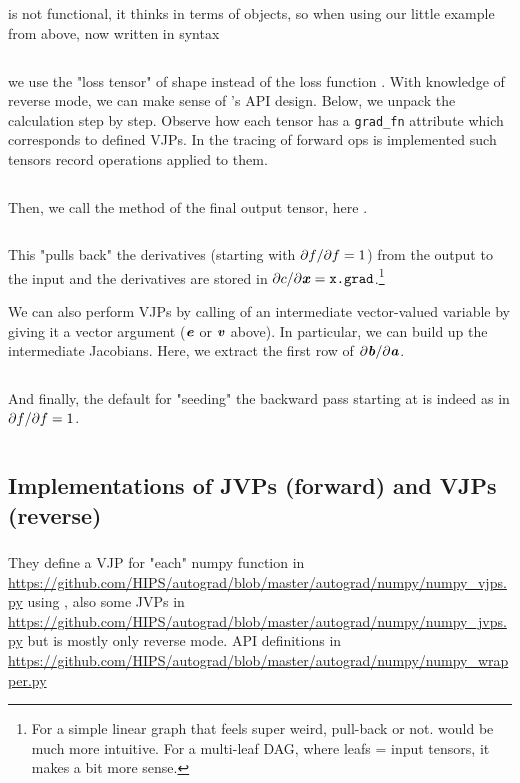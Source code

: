 \documentclass[paper=a4,11pt,headsepline]{scrartcl}
\newcommand{\ipmpy}[1]{\inputminted[xleftmargin=0.9cm]{python}{#1}}
\begin{document}
\subsection{\pytorch}
%
\pytorch is not functional, it thinks in terms of  objects, so
when using our little example from above, now written in \pytorch syntax
%
\ipmpy{../talk/code/pytorch_fwd_rev_1.py}
%
we use the "loss tensor"  of shape  instead of the loss function
. With knowledge of reverse mode, we can make sense of \pytorch's API
design. Below, we unpack the calculation step by step. Observe how each tensor
has a \verb|grad_fn| attribute which corresponds to defined VJPs. In \pytorch
the tracing of forward ops is implemented such tensors record
operations applied to them.
%
\ipmpy{../talk/code/pytorch_fwd_rev_2.py}
%
Then, we call the  method of the final output tensor, here
.
%
\ipmpy{../talk/code/pytorch_fwd_rev_3.py}
%
This "pulls back" the derivatives (starting with $\partial f/\partial f=1$) from the
output  to the input and the derivatives are stored in $\partial c/\partial \bm{\mathit{x}} =
\texttt{x.grad}$.\footnote{For a simple linear graph that feels super weird,
pull-back or not.  would be much more intuitive. For a multi-leaf
DAG, where leafs = input tensors, it makes a bit more sense.}

We can also perform VJPs by calling  of an intermediate
vector-valued variable by giving it a vector argument ($\bm{\mathit{e}}$ or $\bm{\mathit{v}}$ above). In particular, we can build up the intermediate
Jacobians. Here, we extract the first row of $\partial \bm{\mathit{b}}/\partial \bm{\mathit{a}}$.
%
\ipmpy{../talk/code/pytorch_rev_detail_2.py}
%
And finally, the default for "seeding" the backward pass starting at 
is indeed  as in $\partial f/\partial f=1$.
%
\ipmpy{../talk/code/pytorch_rev_detail_1.py}

\subsection{Implementations of JVPs (forward) and VJPs (reverse)}

\subsubsection{\autograd}

They define a VJP for "each" numpy function in
\url{https://github.com/HIPS/autograd/blob/master/autograd/numpy/numpy_vjps.py}
using , also some JVPs in
\url{https://github.com/HIPS/autograd/blob/master/autograd/numpy/numpy_jvps.py}
but \autograd is mostly only reverse mode. \numpy API definitions in
\url{https://github.com/HIPS/autograd/blob/master/autograd/numpy/numpy_wrapper.py}
\end{document}
